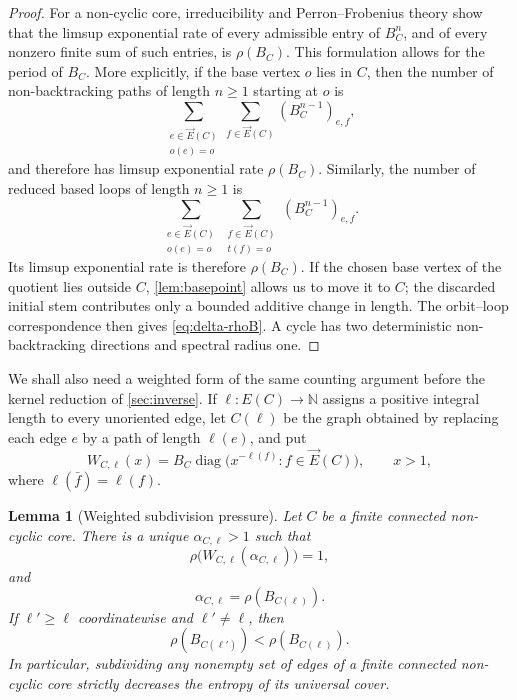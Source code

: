 \documentclass[11pt]{amsart}
\theoremstyle{plain}
\newtheorem{lemma}[theorem]{Lemma}
\theoremstyle{definition}
\theoremstyle{remark}
\begin{document}
\begin{proof}
For a non-cyclic core, irreducibility and Perron--Frobenius theory show that
the limsup exponential rate of every admissible entry of \(B_C^n\), and of
every nonzero finite sum of such entries, is \(\rho(B_C)\).  This formulation
allows for the period of \(B_C\).  More explicitly, if the base vertex
\(o\) lies in \(C\), then the number of non-backtracking paths of length
\(n\geq1\) starting at \(o\) is
\[
  \sum_{\substack{e\in\vec E(C)\\o(e)=o}}
  \sum_{f\in\vec E(C)}
  (B_C^{n-1})_{e,f},
\]
and therefore has limsup exponential rate \(\rho(B_C)\).  Similarly, the
number of reduced based loops of length \(n\geq1\) is
\[
  \sum_{\substack{e\in\vec E(C)\\o(e)=o}}
  \sum_{\substack{f\in\vec E(C)\\t(f)=o}}
  (B_C^{n-1})_{e,f}.
\]
Its limsup exponential rate is therefore \(\rho(B_C)\).  If the chosen base
vertex of the quotient
lies outside \(C\), \cref{lem:basepoint} allows us to move it to \(C\); the
discarded initial stem contributes only a bounded additive change in length.
The orbit--loop correspondence then gives \eqref{eq:delta-rhoB}.  A cycle has
two deterministic non-backtracking directions and spectral radius one.
\end{proof}

We shall also need a weighted form of the same counting argument before the
kernel reduction of \cref{sec:inverse}.  If
\(\ell:E(C)\to\mathbb N\) assigns a positive integral length to every
unoriented edge, let \(C(\ell)\) be the graph obtained by replacing each edge
\(e\) by a path of length \(\ell(e)\), and put
\begin{equation}\label{eq:early-weighted-turn}
  W_{C,\ell}(x)
  =B_C\operatorname{diag}\bigl(x^{-\ell(f)}:
      f\in\vec E(C)\bigr),
  \qquad x>1,
\end{equation}
where \(\ell(\bar f)=\ell(f)\).

\begin{lemma}[Weighted subdivision pressure]
\label{lem:weighted-subdivision-pressure}
Let \(C\) be a finite connected non-cyclic core.  There is a unique
\(\alpha_{C,\ell}>1\) such that
\begin{equation}\label{eq:early-weighted-pressure}
  \rho\bigl(W_{C,\ell}(\alpha_{C,\ell})\bigr)=1,
\end{equation}
and
\[
  \alpha_{C,\ell}=\rho(B_{C(\ell)}).
\]
If \(\ell'\geq\ell\) coordinatewise and \(\ell'\neq\ell\), then
\begin{equation}\label{eq:strict-subdivision-pressure}
  \rho(B_{C(\ell')})<\rho(B_{C(\ell)}).
\end{equation}
In particular, subdividing any nonempty set of edges of a finite connected
non-cyclic core strictly decreases the entropy of its universal cover.
\end{lemma}
\end{document}
